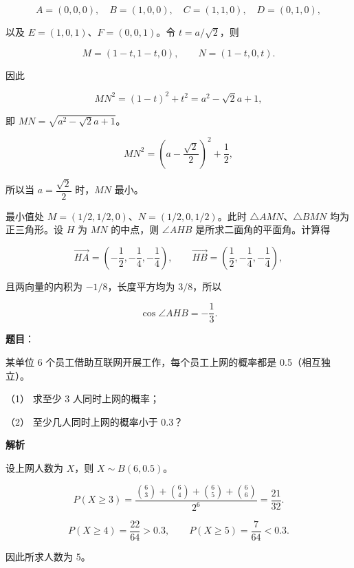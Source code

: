 \begin{answer}
\nopagebreak[4]
\[
A=(0,0,0),\quad B=(1,0,0),\quad C=(1,1,0),\quad D=(0,1,0),
\]

以及 $E=(1,0,1)$、$F=(0,0,1)$。令 $t=a/\sqrt2$，则

\nopagebreak[4]
\[
M=(1-t,1-t,0),\qquad N=(1-t,0,t).
\]

因此

\nopagebreak[4]
\[
MN^2=(1-t)^2+t^2=a^2-\sqrt2a+1,
\]

即 $MN=\sqrt{a^2-\sqrt2a+1}$。


\nopagebreak[4]
\[
MN^2=\left(a-\frac{\sqrt2}{2}\right)^2+\frac12,
\]

所以当 $a=\dfrac{\sqrt2}{2}$ 时，$MN$ 最小。


最小值处 $M=(1/2,1/2,0)$、$N=(1/2,0,1/2)$。此时 $\triangle AMN$、$\triangle BMN$ 均为正三角形。设 $H$ 为 $MN$ 的中点，则 $\angle AHB$ 是所求二面角的平面角。计算得

\nopagebreak[4]
\[
\overrightarrow{HA}=\left(-\frac12,-\frac14,-\frac14\right),\qquad
\overrightarrow{HB}=\left(\frac12,-\frac14,-\frac14\right),
\]

且两向量的内积为 $-1/8$，长度平方均为 $3/8$，所以

\nopagebreak[4]
\[
\cos\angle AHB=-\frac13.
\]




\end{answer}
\begin{answer}

\textbf{题目}：

某单位 6 个员工借助互联网开展工作，每个员工上网的概率都是 0.5（相互独立）。

（1） 求至少 3 人同时上网的概率；

（2） 至少几人同时上网的概率小于 0.3？

\textbf{解析}

设上网人数为 $X$，则 $X\sim B(6,0.5)$。


\nopagebreak[4]
\[
P(X\geqslant3)
=\frac{\binom63+\binom64+\binom65+\binom66}{2^6}
=\frac{21}{32}.
\]


\nopagebreak[4]
\[
P(X\geqslant4)=\frac{22}{64}>0.3,\qquad
P(X\geqslant5)=\frac7{64}<0.3.
\]

因此所求人数为 5。



\end{answer}
